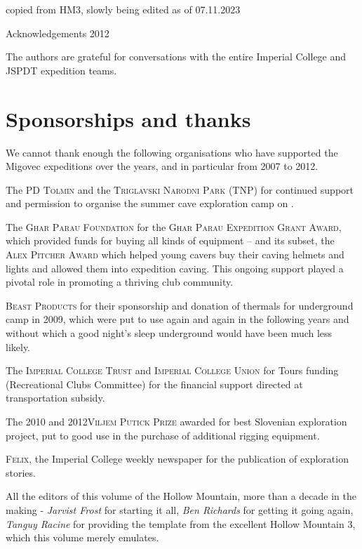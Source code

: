 copied from HM3, slowly being edited as of 07.11.2023





Acknowledgements 2012

The authors are grateful for conversations with the entire Imperial
College and JSPDT expedition teams.



\chapter{Sponsorships and thanks}
We cannot thank enough the following organisations who have supported the Migovec expeditions over the years, and in particular from 2007 to 2012.
\begin{citemize}
\item The \textsc{PD Tolmin} and the \textsc{Triglavski
Narodni Park} (TNP) for continued support and permission to organise the
summer cave exploration camp on .
\item The \textsc{Ghar Parau Foundation} for the \textsc{Ghar Parau Expedition Grant Award}, which provided funds for buying all kinds of equipment -- and its subset, the \textsc{Alex Pitcher Award} which helped young cavers buy their caving helmets and lights and allowed them into expedition caving. This ongoing support played a pivotal role in promoting a thriving club community.
\item \textsc{Beast Products} for their sponsorship and donation of thermals for underground camp in 2009, which were put to use again and again in the following years and without which a good night's sleep underground would have been much less likely.
\item The \textsc{Imperial College Trust} and  \textsc{Imperial College Union} for Tours funding (Recreational
Clubs Committee) for the financial support directed at transportation subsidy.

\item The 2010 and 2012\textsc{Viljem Putick Prize} awarded for best Slovenian exploration project, put to good use in the purchase of additional rigging equipment.

\item \textsc{Felix}, the Imperial College weekly newspaper for the publication of exploration stories.


\mydelimiter

\item All the editors of this volume of the Hollow Mountain, more than a decade in the making - \textit{Jarvist Frost} for starting it all, \textit{Ben Richards} for getting it going again, \textit{Tanguy Racine} for providing the template from the excellent Hollow Mountain 3, which this volume merely emulates. 


\end{citemize}
